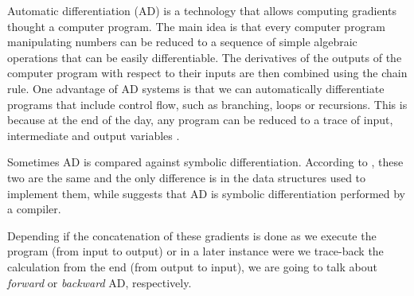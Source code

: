 Automatic differentiation (AD) is a technology that allows computing gradients thought a computer program. The main idea is that every computer program manipulating numbers can be reduced to a sequence of simple algebraic operations that can be easily differentiable. The derivatives of the outputs of the computer program with respect to their inputs are then combined using the chain rule.
One advantage of AD systems is that we can automatically differentiate programs that include control flow, such as branching, loops or recursions. This is because at the end of the day, any program can be reduced to a trace of input, intermediate and output variables \cite{Baydin_Pearlmutter_Radul_Siskind_2015}.

Sometimes AD is compared against symbolic differentiation.
According to \cite{Laue2020}, these two are the same and the only difference is in the data structures used to implement them, while \cite{Elliott_2018} suggests that AD is symbolic differentiation performed by a compiler.

Depending if the concatenation of these gradients is done as we execute the program (from input to output) or in a later instance were we trace-back the calculation from the end (from output to input), we are going to talk about \textit{forward} or \textit{backward} AD, respectively.

